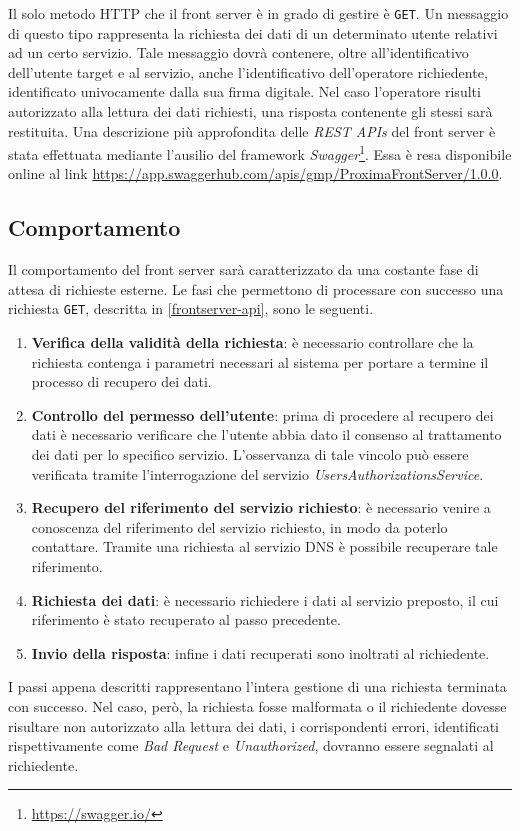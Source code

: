 \documentclass[a4paper,12pt]{report}
\begin{document}
Il solo metodo HTTP che il front server è in grado di gestire è \texttt{GET}. Un messaggio di questo tipo rappresenta la richiesta dei dati di un determinato utente relativi ad un certo servizio. Tale messaggio dovrà contenere, oltre all'identificativo dell'utente target e al servizio, anche l'identificativo dell'operatore richiedente, identificato univocamente dalla sua firma digitale. Nel caso l'operatore risulti autorizzato alla lettura dei dati richiesti, una risposta contenente gli stessi sarà restituita. Una descrizione più approfondita delle \emph{REST APIs} del front server è stata effettuata mediante l'ausilio del framework \emph{Swagger}\footnote{\url{https://swagger.io/}}. Essa è resa disponibile online al link \url{https://app.swaggerhub.com/apis/gmp/ProximaFrontServer/1.0.0}.

\subsection{Comportamento} \label{frontserver-behaviour}
Il comportamento del front server sarà caratterizzato da una costante fase di attesa di richieste esterne. Le fasi che permettono di processare con successo una richiesta \texttt{GET}, descritta in \autoref{frontserver-api}, sono le seguenti.
\begin{enumerate}
	\item \textbf{Verifica della validità della richiesta}: è necessario controllare che la richiesta contenga i parametri necessari al sistema per portare a termine il processo di recupero dei dati.
	\item \textbf{Controllo del permesso dell'utente}: prima di procedere al recupero dei dati è necessario verificare che l'utente abbia dato il consenso al trattamento dei dati per lo specifico servizio. L'osservanza di tale vincolo può essere verificata tramite l'interrogazione del servizio \emph{UsersAuthorizationsService}.
	\item \textbf{Recupero del riferimento del servizio richiesto}: è necessario venire a conoscenza del riferimento del servizio richiesto, in modo da poterlo contattare. Tramite una richiesta al servizio DNS è possibile recuperare tale riferimento.
	\item \textbf{Richiesta dei dati}: è necessario richiedere i dati al servizio preposto, il cui riferimento è stato recuperato al passo precedente.
	\item \textbf{Invio della risposta}: infine i dati recuperati sono inoltrati al richiedente.
\end{enumerate}
I passi appena descritti rappresentano l'intera gestione di una richiesta terminata con successo. Nel caso, però, la richiesta fosse malformata o il richiedente dovesse risultare non autorizzato alla lettura dei dati, i corrispondenti errori, identificati rispettivamente come \emph{Bad Request} e \emph{Unauthorized}, dovranno essere segnalati al richiedente.
\end{document}
